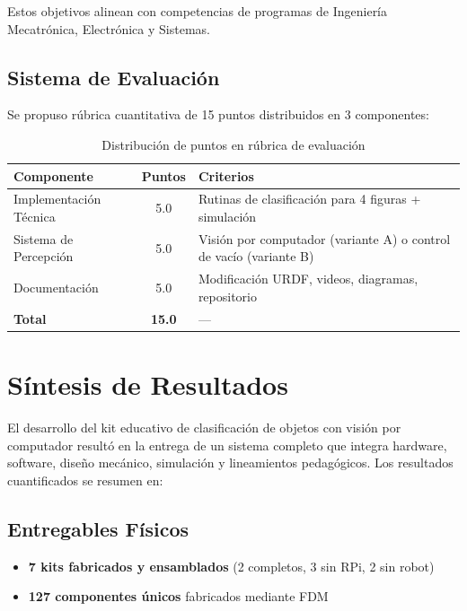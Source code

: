 Estos objetivos alinean con competencias de programas de Ingeniería Mecatrónica, Electrónica y Sistemas.

\subsection{Sistema de Evaluación}

Se propuso rúbrica cuantitativa de 15 puntos distribuidos en 3 componentes:

\begin{table}[H]
\centering
\caption{Distribución de puntos en rúbrica de evaluación}
\label{tab:rubrica_evaluacion}
\begin{tabular}{|l|c|p{7cm}|}
\hline
\textbf{Componente} & \textbf{Puntos} & \textbf{Criterios} \\
\hline
Implementación Técnica & 5.0 & Rutinas de clasificación para 4 figuras + simulación \\
\hline
Sistema de Percepción & 5.0 & Visión por computador (variante A) o control de vacío (variante B) \\
\hline
Documentación & 5.0 & Modificación URDF, videos, diagramas, repositorio \\
\hline
\textbf{Total} & \textbf{15.0} & --- \\
\hline
\end{tabular}
\end{table}

\section{Síntesis de Resultados}

El desarrollo del kit educativo de clasificación de objetos con visión por computador resultó en la entrega de un sistema completo que integra hardware, software, diseño mecánico, simulación y lineamientos pedagógicos. Los resultados cuantificados se resumen en:

\subsection{Entregables Físicos}

\begin{itemize}
    \item \textbf{7 kits fabricados y ensamblados} (2 completos, 3 sin RPi, 2 sin robot)
    \item \textbf{127 componentes únicos} fabricados mediante FDM
\end{itemize}

